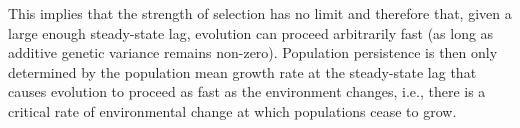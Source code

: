 \documentclass[12pt,letterpaper]{article} %
\begin{document}
This implies that the strength of selection has no limit and therefore that, given a large enough steady-state lag, evolution can proceed arbitrarily fast (as long as additive genetic variance remains non-zero).
Population persistence is then only determined by the population mean growth rate at the steady-state lag that causes evolution to proceed as fast as the environment changes, i.e., there is a critical rate of environmental change at which populations cease to grow.

\end{document}

